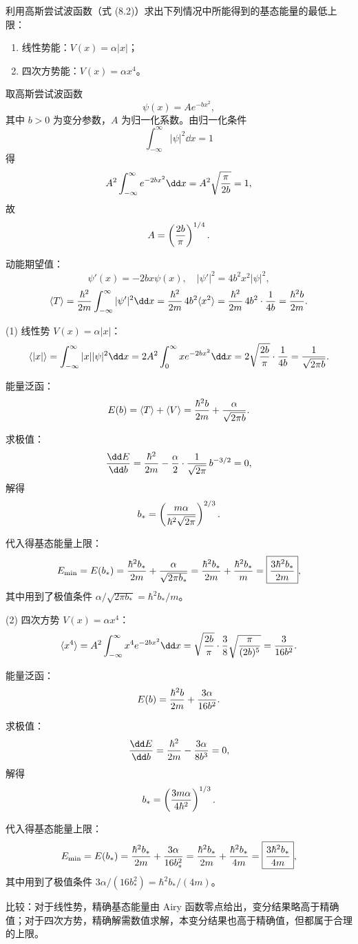 \begin{question}
利用高斯尝试波函数（式 (8.2)）求出下列情况中所能得到的基态能量的最低上限：
\begin{enumerate}
\item 线性势能：$V(x)=\alpha |x|$；
\item 四次方势能：$V(x)=\alpha x^4$。
\end{enumerate}

\par\smallskip
{}

\end{question}
\begin{solution}
取高斯尝试波函数
\[
\psi(x)=A e^{-b x^2},
\]
其中 $b>0$ 为变分参数，$A$ 为归一化系数。由归一化条件
\[
\int_{-\infty}^\infty|\psi|^2\dd x=1
\]
得
\[
A^2\int_{-\infty}^\infty e^{-2b x^2}\dd x
=A^2\sqrt{\pi\over2b}=1,
\]
故
\[
A=\left({2b\over\pi}\right)^{1/4}.
\]

动能期望值：
\[
\psi'(x)=-2b x\psi(x),\quad |\psi'|^2=4b^2x^2|\psi|^2,
\]
\[
\langle T\rangle={\hbar^2\over2m}\int_{-\infty}^\infty|\psi'|^2\dd x
={\hbar^2\over2m}\,4b^2\langle x^2\rangle
={\hbar^2\over2m}\,4b^2\cdot{1\over4b}
={\hbar^2 b\over2m}.
\]

(1) 线性势 $V(x)=\alpha|x|$：
\[
\langle |x|\rangle = \int_{-\infty}^\infty|x||\psi|^2\dd x
=2A^2\int_0^\infty x e^{-2b x^2}\dd x
=2\sqrt{2b\over\pi}\cdot{1\over4b}
={1\over\sqrt{2\pi b}}.
\]

能量泛函：
\[
E(b)=\langle T\rangle+\langle V\rangle
={\hbar^2 b\over2m}+{\alpha\over\sqrt{2\pi b}}.
\]

求极值：
\[
{\dd E\over\dd b}={\hbar^2\over2m}-{\alpha\over2}\cdot{1\over\sqrt{2\pi}}\,b^{-3/2}=0,
\]
解得
\[
b_*=\left({m\alpha\over\hbar^2\sqrt{2\pi}}\right)^{2/3}.
\]

代入得基态能量上限：
\[
E_{\min}=E(b_*)={\hbar^2 b_*\over2m}+{\alpha\over\sqrt{2\pi b_*}}
={\hbar^2 b_*\over2m}+{\hbar^2 b_*\over m}
=\boxed{{3\hbar^2 b_*\over2m}},
\]
其中用到了极值条件 $\alpha/\sqrt{2\pi b_*}=\hbar^2 b_*/m$。

(2) 四次方势 $V(x)=\alpha x^4$：
\[
\langle x^4\rangle = A^2\int_{-\infty}^\infty x^4 e^{-2b x^2}\dd x
=\sqrt{2b\over\pi}\cdot{3\over8}\sqrt{\pi\over(2b)^5}
={3\over16b^2}.
\]

能量泛函：
\[
E(b)={\hbar^2 b\over2m}+{3\alpha\over16b^2}.
\]

求极值：
\[
{\dd E\over\dd b}={\hbar^2\over2m}-{3\alpha\over8b^3}=0,
\]
解得
\[
b_*=\left({3m\alpha\over4\hbar^2}\right)^{1/3}.
\]

代入得基态能量上限：
\[
E_{\min}=E(b_*)={\hbar^2 b_*\over2m}+{3\alpha\over16b_*^2}
={\hbar^2 b_*\over2m}+{\hbar^2 b_*\over4m}
=\boxed{{3\hbar^2 b_*\over4m}},
\]
其中用到了极值条件 $3\alpha/(16b_*^2)=\hbar^2 b_*/(4m)$。

比较：对于线性势，精确基态能量由 Airy 函数零点给出，变分结果略高于精确值；对于四次方势，精确解需数值求解，本变分结果也高于精确值，但都属于合理的上限。
\end{solution}

